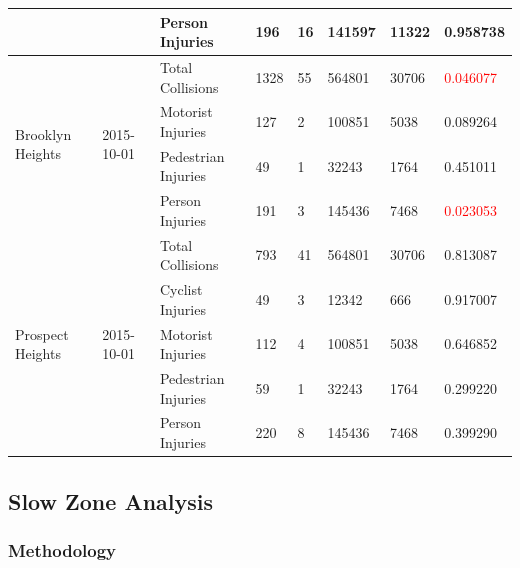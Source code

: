 \documentclass[10pt,journal,compsoc]{IEEEtran}
\begin{document}
\begin{table}[]
\begin{tabular}{|l|l|l|l|l|l|l|l|}
                                            &                             & Person Injuries     & 196       & 16       & 141597     & 11322     & 0.958738 \\ \hline
\multirow{4}{*}{Brooklyn Heights}           & \multirow{4}{*}{2015-10-01} & Total Collisions    & 1328      & 55       & 564801     & 30706     & \textcolor{red}{0.046077} \\ \cline{3-8} 
                                            &                             & Motorist Injuries   & 127       & 2        & 100851     & 5038      & 0.089264 \\ \cline{3-8} 
                                            &                             & Pedestrian Injuries & 49        & 1        & 32243      & 1764      & 0.451011 \\ \cline{3-8} 
                                            &                             & Person Injuries     & 191       & 3        & 145436     & 7468      & \textcolor{red}{0.023053} \\ \hline
\multirow{5}{*}{Prospect Heights}           & \multirow{5}{*}{2015-10-01} & Total Collisions    & 793       & 41       & 564801     & 30706     & 0.813087 \\ \cline{3-8} 
                                            &                             & Cyclist Injuries    & 49        & 3        & 12342      & 666       & 0.917007 \\ \cline{3-8} 
                                            &                             & Motorist Injuries   & 112       & 4        & 100851     & 5038      & 0.646852 \\ \cline{3-8} 
                                            &                             & Pedestrian Injuries & 59        & 1        & 32243      & 1764      & 0.299220 \\ \cline{3-8} 
                                            &                             & Person Injuries     & 220       & 8        & 145436     & 7468      & 0.399290 \\ \hline
\end{tabular}
\end{table}



\subsection{Slow Zone Analysis}

\subsubsection{Methodology}
\end{document}
